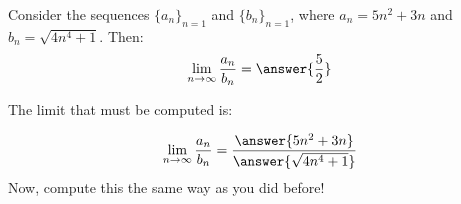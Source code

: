 \documentclass{ximera}
\author{Jim Talamo}
\begin{document}
\begin{exercise}

Consider the sequences $\{a_n \}_{n=1}$ and $\{b_n \}_{n=1}$, where $a_n =5n^2+3n$ and $b_n = \sqrt{4n^4+1}$.  Then:
\[
\lim_{n \to \infty} \frac{a_n}{b_n} = \answer{\frac{5}{2}}
\]

\begin{hint}
The limit that must be computed is:

\[
\lim_{n \to \infty} \frac{a_n}{b_n} = \frac{\answer{5n^2+3n}}{\answer{\sqrt{4n^4+1}}}
\]
Now, compute this the same way as you did before!
\end{hint}

\end{exercise}
\end{document}
